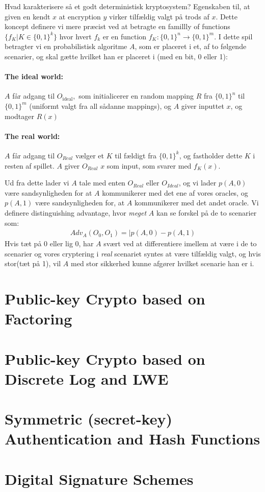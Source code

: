 \documentclass[paper=a4, fontsize=11pt]{scrartcl} %
\numberwithin{equation}{section} %
\numberwithin{figure}{section} %
\numberwithin{table}{section} %
\begin{document}
	Hvad karakterisere så et godt deterministisk kryptosystem? Egenskaben til, at given en kendt $x$ at encryption $y$ virker tilfældig valgt på trods af $x$. Dette koncept definere vi mere præcist ved at betragte en famillly of functions $\{f_K|K\in\{0,1\}^k\}$ hvor hvert $f_k$ er en function $f_K:\{0,1\}^n \rightarrow \{0,1\}^m$. I dette spil betragter vi en probabilistisk algoritme $A$, som er placeret i et, af to følgende scenarier, og skal gætte hvilket han er placeret i (med en bit, 0 eller 1):
	
	\paragraph{\textbf{The ideal world:}} $A$ får adgang til $O_{\text{ideal}},$ som initialicerer en random mapping $R$ fra $\{0,1\}^n$ til $\{0,1\}^m$ (uniformt valgt fra all sådanne mappings), og $A$ giver inputtet $x$, og modtager $R(x)$
	\paragraph{\textbf{The real world:}} $A$ får adgang til $O_{Real}$ vælger et $K$ til fældigt fra $\{0,1\}^k$, og fastholder dette $K$ i resten af spillet. $A$ giver $O_{Real}$ $x$ som input, som svarer med $f_K(x)$.
		
	Ud fra dette lader vi $A$ tale med enten $O_{Real}$ eller $O_{Ideal}$, og vi lader $p(A,0)$ være sandsynligheden for at $A$ kommunikerer med det ene af vores oracles, og $p(A,1)$ være sandsynligheden for, at $A$ kommunikerer	med det andet oracle. Vi definere distinguishing advantage, hvor \textit{meget} $A$ kan se forskel på de to scenarier som:
	\begin{align*}
	Adv_A(O_0,O_1)=|p(A,0)-p(A,1)
	\end{align*}
	Hvis tæt på 0 eller lig 0, har $A$ svært ved at differentiere imellem at være i de to scenarier og vores cryptering i \textit{real} scenariet syntes at være tilfældig valgt, og hvis stor(tæt på 1), vil $A$ med stor sikkerhed kunne afgører hvilket scenarie han er i.
		
		
 	\section{Public-key Crypto based on Factoring}
	
	\section{Public-key Crypto based on Discrete Log and LWE}
	
	\section{Symmetric (secret-key) Authentication and Hash Functions}
	
	\section{Digital Signature Schemes}
\end{document}
